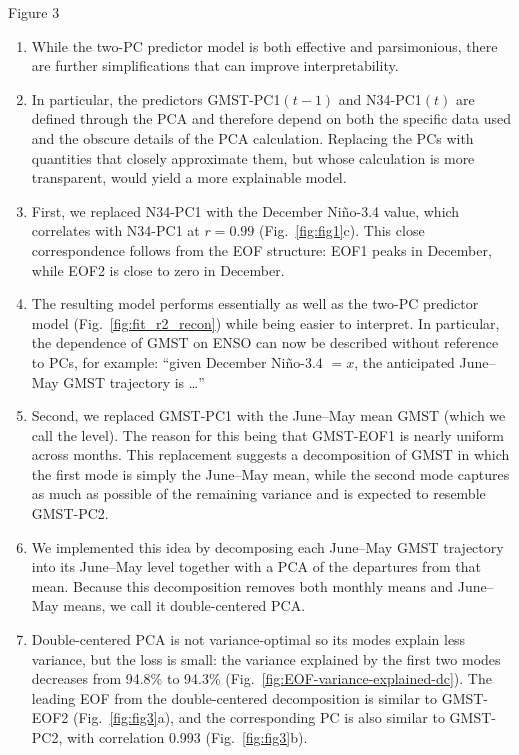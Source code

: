 \documentclass[aspectratio=169,xcolor=dvipsnames]{beamer}
\begin{document}
\begin{frame}{Figure 3}
  \begin{enumerate}\fontsize{5pt}{7pt}\selectfont

  \item While the two-PC predictor model is both effective and
    parsimonious, there are further simplifications that can improve
    interpretability.

  \item In particular, the predictors GMST-PC1$(t-1)$ and N34-PC1$(t)$
    are defined through the PCA and therefore depend on both the
    specific data used and the obscure details of the PCA
    calculation. Replacing the PCs with quantities that closely
    approximate them, but whose calculation is more transparent, would
    yield a more explainable model.

  \item First, we replaced N34-PC1 with the December Ni\~no-3.4 value,
    which correlates with N34-PC1 at $r=0.99$ (Fig.\
    \ref{fig:fig1}c). This close correspondence follows from the EOF
    structure: EOF1 peaks in December, while EOF2 is close to zero in
    December.

  \item The resulting model performs essentially as well as the two-PC
    predictor model (Fig.\ \ref{fig:fit_r2_recon}) while being easier
    to interpret. In particular, the dependence of GMST on ENSO can
    now be described without reference to PCs, for example: ``given
    December Ni\~no-3.4 $=x$, the anticipated June--May GMST trajectory
    is \ldots''
  
  \item Second, we replaced GMST-PC1 with the June--May mean GMST
    (which we call the level). The reason for this being that
    GMST-EOF1 is nearly uniform across months. This replacement
    suggests a decomposition of GMST in which the first mode is simply
    the June--May mean, while the second mode captures as much as
    possible of the remaining variance and is expected to resemble
    GMST-PC2.

  \item We implemented this idea by decomposing each June--May GMST
    trajectory into its June--May level together with a PCA of the
    departures from that mean. Because this decomposition removes both
    monthly means and June--May means, we call it double-centered PCA.
    
  \item Double-centered PCA is not variance-optimal so its modes
    explain less variance, but the loss is small: the variance
    explained by the first two modes decreases from 94.8\% to 94.3\%
    (Fig.\ \ref{fig:EOF-variance-explained-dc}). The leading EOF from
    the double-centered decomposition is similar to GMST-EOF2 (Fig.\
    \ref{fig:fig3}a), and the corresponding PC is also similar to
    GMST-PC2, with correlation 0.993 (Fig.\ \ref{fig:fig3}b).


\end{enumerate}
\end{frame}
\end{document}
